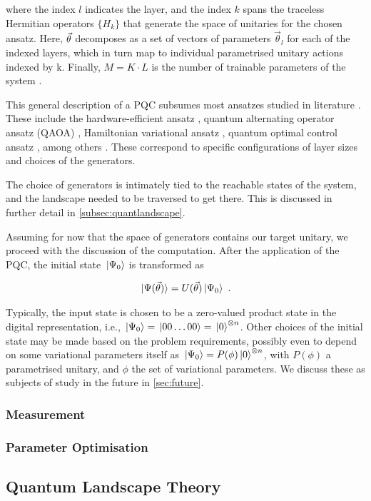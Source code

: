where the index \(l\) indicates the layer, and the index \(k\) spans the
traceless Hermitian operators \(\{H_k\}\) that generate the space of unitaries
for the chosen ansatz. Here, \(\vec{\theta}\) decomposes as a set of vectors of
parameters \(\vec{\theta}_l\) for each of the indexed layers, which in turn map
to individual parametrised unitary actions indexed by k. Finally, \(M = K \cdot
L\) is the number of trainable parameters of the system \cite[see][section
II.A]{larocca2021theory}.

This general description of a PQC subsumes most ansatzes studied in literature
\cite{larocca2021diagnosing}. These include the hardware-efficient ansatz
\cite{kandala2017hardware}, quantum alternating operator ansatz (QAOA)
\cite{farhi2014quantum}, Hamiltonian variational ansatz
\cite{wecker2015progress}, quantum optimal control ansatz
\cite{choquette2021quantum}, among others \cite{hadfield2019quantum,
zhu2020adaptive, lee2021progress}. These correspond to specific configurations
of layer sizes and choices of the generators.

The choice of generators is intimately tied to the reachable states of the
system, and the landscape needed to be traversed to get there. This is discussed
in further detail in \autoref{subsec:quantlandscape}.

Assuming for now that the space of generators contains our target unitary, we
proceed with the discussion of the computation. After the application of the
PQC, the initial state \(\ket*{\Psi_0}\) is transformed as

\begin{gather}
    \ket*{\Psi(\vec{\theta})} = U(\vec{\theta})\ket*{\Psi_0}~.
\end{gather}

Typically, the input state is chosen to be a zero-valued product state in the
digital representation, i.e., \(\ket*{\Psi_0} = \ket*{00\ldots 00} =
\ket*{0}^{\otimes n}\). Other choices of the initial state may be made based on
the problem requirements, possibly even to depend on some variational parameters
itself as \(\ket*{\Psi_0} = P(\phi) \ket*{0}^{\otimes n}\), with \(P(\phi)\) a
parametrised unitary, and \(\phi\) the set of variational parameters. We discuss
these as subjects of study in the future in \autoref{sec:future}.

\subsubsection{Measurement}

\subsubsection{Parameter Optimisation}

\subsection{Quantum Landscape Theory}
\label{subsec:quantlandscape}